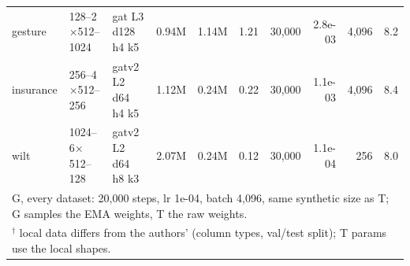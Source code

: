 \begin{table}[t]
\begin{tabular}{lllrrrrrrr}
gesture & 128--2$\times$512--1024 & gat L3 d128 h4 k5 & 0.94M & 1.14M & 1.21 & 30{,}000 & 2.8e-03 & 4{,}096 & 8.2 \\
insurance & 256--4$\times$512--256 & gatv2 L2 d64 h4 k5 & 1.12M & 0.24M & 0.22 & 30{,}000 & 1.1e-03 & 4{,}096 & 8.4 \\
wilt & 1024--6$\times$512--128 & gatv2 L2 d64 h8 k3 & 2.07M & 0.24M & 0.12 & 30{,}000 & 1.1e-04 & 256 & 8.0 \\
\midrule
\multicolumn{10}{l}{G, every dataset: 20{,}000 steps, lr 1e-04, batch 4{,}096, same synthetic size as T; G samples the EMA weights, T the raw weights.} \\
\multicolumn{10}{l}{$^\dagger$ local data differs from the authors' (column types, val/test split); T params use the local shapes.} \\
\bottomrule
\end{tabular}
\end{table}

